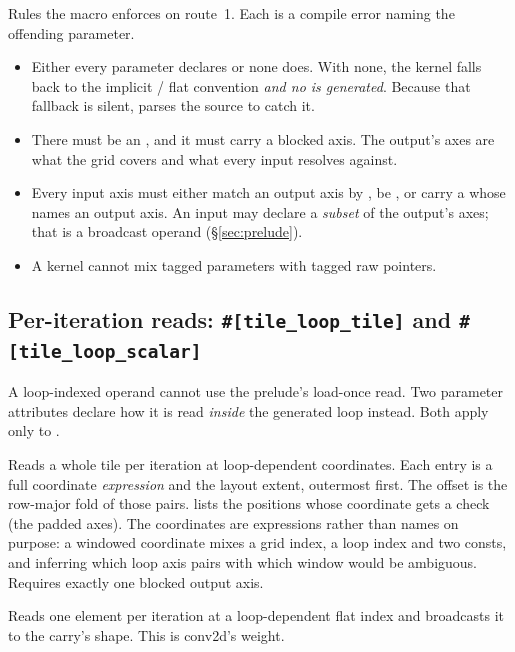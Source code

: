 Rules the macro enforces on route~1. Each is a compile error naming the offending
parameter.
\begin{itemize}
\item Either every  parameter declares \code{#[tile]} or none does. With
  none, the kernel falls back to the implicit /
  flat convention \emph{and no  is generated}. Because that
  fallback is silent,  parses the source to
  catch it.
\item There must be an , and it must carry a blocked axis. The
  output's axes are what the grid covers and what every input resolves against.
\item Every input axis must either match an output axis by , be , or carry a  whose  names an
  output axis. An input may declare a \emph{subset} of the output's axes; that is a
  broadcast operand (\S\ref{sec:prelude}).
\item A kernel cannot mix tagged  parameters with tagged raw pointers.
\end{itemize}

\subsection{Per-iteration reads: \texttt{\#[tile\_loop\_tile]} and \texttt{\#[tile\_loop\_scalar]}}

A loop-indexed operand cannot use the prelude's load-once read. Two
parameter attributes declare how it is read \emph{inside} the generated loop
instead. Both apply only to .

\begin{description}[leftmargin=1.2em,style=nextline]
\item[{\code{#[tile_loop_tile(index = [coord = extent, ..], bounds = [i, ..])]}}]
  Reads a whole tile per iteration at loop-dependent coordinates. Each 
  entry is a full coordinate \emph{expression} and the layout extent, outermost
  first. The offset is the row-major fold of those pairs.  lists the
  positions whose coordinate gets a  check (the padded
  axes). The coordinates are expressions rather than names on purpose: a windowed
  coordinate mixes a grid index, a loop index and two consts, and inferring which
  loop axis pairs with which window would be ambiguous. Requires exactly one
  blocked output axis.
\item[{\code{#[tile_loop_scalar(index = [idx = extent, ..])]}}]
  Reads one element per iteration at a loop-dependent flat index and broadcasts it
  to the carry's shape. This is conv2d's weight.
\end{description}


